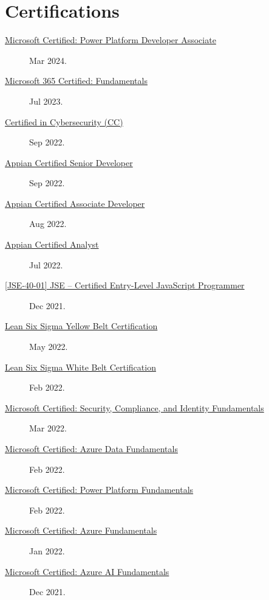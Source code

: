 \documentclass{article}
\begin{document}
\section*{Certifications}\vspace{-0.5em}
\begin{description}
  \item [\href{https://learn.microsoft.com/api/credentials/share/en-us/AlexKoikCestone-7541/99C5F49578EE2C21?sharingId=DCF7D068E6ED12E6}{Microsoft Certified: Power Platform Developer Associate}] Mar 2024.
  \item [\href{https://learn.microsoft.com/api/credentials/share/en-us/AlexKoikCestone-7541/34191BBB3EBF09A3?sharingId=DCF7D068E6ED12E6}{Microsoft 365 Certified: Fundamentals}] Jul 2023.
  \item [\href{https://www.credly.com/badges/f0aab7ce-2f5d-4569-8705-3dc23fc34200/public_url}{Certified in Cybersecurity (CC)}] Sep 2022.
  \item [\href{https://community.appian.com/members/alexanderk7594?badge=cert&now=637997122455046997}{Appian Certified Senior Developer}] Sep 2022.
  \item [\href{https://community.appian.com/members/alexanderk7594?badge=cert&now=637997122455046997}{Appian Certified Associate Developer}] Aug 2022.
  \item [\href{https://community.appian.com/members/alexanderk7594?badge=cert&now=637997122455046997}{Appian Certified Analyst}] Jul 2022.
  \item [\href{https://www.credly.com/badges/e75210e4-8d08-43ea-af72-ec70ef666eee/public_url}{[JSE-40-01] JSE – Certified Entry-Level JavaScript Programmer}] Dec 2021.
  \item [\href{https://api.badgr.io/public/assertions/KE5P9gfoQ7S3-hpvZP4PIQ}{Lean Six Sigma Yellow Belt Certification}] May 2022.
  \item [\href{https://api.badgr.io/public/assertions/JhPP0s2rQWWGrc9ZkYqhkg}{Lean Six Sigma White Belt Certification}] Feb 2022.
  \item [\href{https://learn.microsoft.com/api/credentials/share/en-us/AlexKoikCestone-7541/DF45C662407C41C5?sharingId=DCF7D068E6ED12E6}{Microsoft Certified: Security, Compliance, and Identity Fundamentals}] Mar 2022.
  \item [\href{https://learn.microsoft.com/api/credentials/share/en-us/AlexKoikCestone-7541/37294D69297F1741?sharingId=DCF7D068E6ED12E6}{Microsoft Certified: Azure Data Fundamentals}] Feb 2022.
  \item [\href{https://learn.microsoft.com/api/credentials/share/en-us/AlexKoikCestone-7541/CE492D7BE04E2F0D?sharingId=DCF7D068E6ED12E6}{Microsoft Certified: Power Platform Fundamentals}] Feb 2022.
  \item [\href{https://learn.microsoft.com/api/credentials/share/en-us/AlexKoikCestone-7541/51E3A61AEA2E3998?sharingId=DCF7D068E6ED12E6}{Microsoft Certified: Azure Fundamentals}] Jan 2022.
  \item [\href{https://learn.microsoft.com/api/credentials/share/en-us/AlexKoikCestone-7541/32EE850D92B0C609?sharingId=DCF7D068E6ED12E6}{Microsoft Certified: Azure AI Fundamentals}] Dec 2021.
\end{description}
\end{document}

